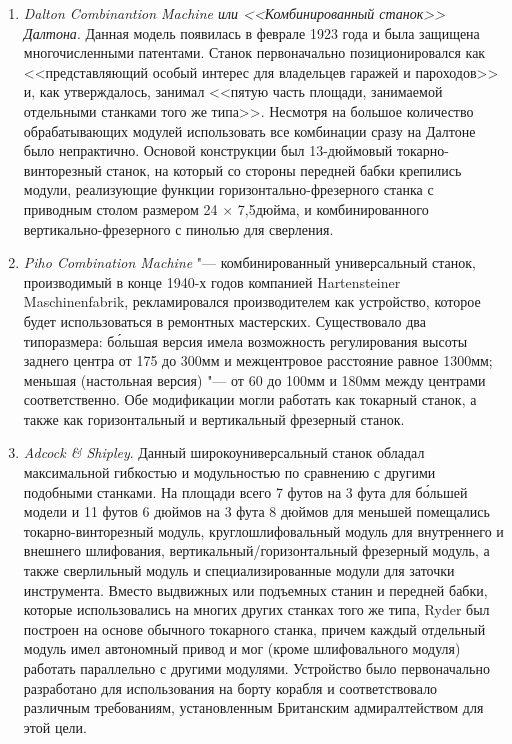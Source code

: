 \begin{enumerate}
	\item\textit{Dalton Combinantion Machine или <<Комбинированный станок>> Далтона}. Данная модель появилась в феврале 1923 года и была защищена многочисленными патентами. Станок первоначально позиционировался как <<представляющий особый интерес для владельцев гаражей и пароходов>> и, как утверждалось, занимал <<пятую часть площади, занимаемой отдельными станками того же типа>>. Несмотря на большое количество обрабатывающих модулей использовать все комбинации сразу на Далтоне было непрактично. Основой конструкции был 13-дюймовый токарно-винторезный станок, на который со стороны передней бабки крепились модули, реализующие функции горизонтально-фрезерного станка с приводным столом размером 24 $\times$ 7,5\:дюйма, и комбинированного вертикально-фрезерного с пинолью для сверления.
	\item\textit{Piho Combination Machine} "--- комбинированный универсальный станок, производимый в конце 1940-х годов компанией Hartensteiner Maschinenfabrik, рекламировался производителем как устройство, которое будет использоваться в ремонтных мастерских. Существовало два типоразмера: б\'ольшая версия имела возможность регулирования высоты заднего центра от 175 до 300\:мм и межцентровое расстояние равное 1300\:мм; меньшая (настольная версия) "--- от 60 до 100\:мм и 180\:мм между центрами соответственно. Обе модификации могли работать как токарный станок, а также как горизонтальный и вертикальный фрезерный станок.
	\item\textit{Adcock \& Shipley}. Данный широкоуниверсальный станок обладал максимальной гибкостью и модульностью по сравнению с другими подобными станками. На площади всего 7 футов на 3 фута для б\'ольшей модели и 11 футов 6 дюймов на 3 фута 8 дюймов для меньшей помещались токарно-винторезный модуль, круглошлифовальный модуль для внутреннего и внешнего шлифования, вертикальный/горизонтальный фрезерный модуль, а также сверлильный модуль и специализированные модули для заточки инструмента. Вместо выдвижных или подъемных станин и передней бабки, которые использовались на многих других станках того же типа, Ryder был построен на основе обычного токарного станка, причем каждый отдельный модуль имел автономный привод и мог (кроме шлифовального модуля) работать параллельно с другими модулями. Устройство было первоначально разработано для использования на борту корабля и соответствовало различным требованиям, установленным Британским адмиралтейством для этой цели.
\end{enumerate}

